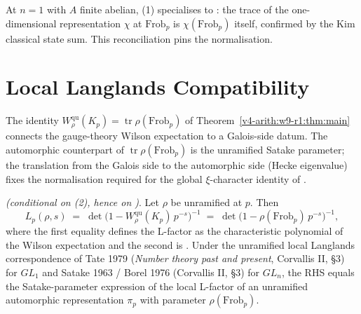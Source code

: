 \begin{remark}
\label{v4-arith:w9-r1:rem:abelian-check}
At \(n=1\) with \(A\) finite abelian,
(1) specialises to
: the trace of the
one-dimensional representation \(\chi\) at \(\mathrm{Frob}_{p}\) is
\(\chi(\mathrm{Frob}_{p})\) itself, confirmed by the Kim classical
state sum. This reconciliation pins the normalisation.
\end{remark}

\section{Local Langlands Compatibility}
\label{v4-arith:w9-r1:sec:langlands}

The identity \(W^{\mathrm{qu}}_{\rho}(K_{p}) = \operatorname{tr}\rho(\mathrm{Frob}_{p})\)
of Theorem~\ref{v4-arith:w9-r1:thm:main} connects the gauge-theory Wilson
expectation to a Galois-side datum. The automorphic counterpart of
\(\operatorname{tr}\rho(\mathrm{Frob}_{p})\) is the unramified Satake
parameter; the translation from the Galois side to the automorphic side
(Hecke eigenvalue) fixes the normalisation required for the global
\(\xi\)-character identity of .

\begin{theorem}
\label{v4-arith:w9-r1:thm:local-L-factor}
\ClaimStatusProvedHereConditional \emph{(conditional on
(2), hence on
)}. Let \(\rho\) be unramified at \(p\).
Then
\begin{equation}
\label{v4-arith:w9-r1:eq:local-L-factor}
L_{p}(\rho,s)
\;=\;\det\!\bigl(1-W^{\mathrm{qu}}_{\rho}(K_{p})\,p^{-s}\bigr)^{-1}
\;=\;\det\!\bigl(1-\rho(\mathrm{Frob}_{p})\,p^{-s}\bigr)^{-1},
\end{equation}
where the first equality defines the L-factor as the characteristic
polynomial of the Wilson expectation and the second is
. Under the unramified local Langlands
correspondence of Tate 1979 (\emph{Number theory past and present},
Corvallis II, \S3) for \(GL_{1}\) and Satake 1963 / Borel 1976
(Corvallis II, \S3) for \(GL_{n}\), the RHS equals the Satake-parameter
expression of the local L-factor of an unramified automorphic
representation \(\pi_{p}\) with parameter \(\rho(\mathrm{Frob}_{p})\).
\end{theorem}

